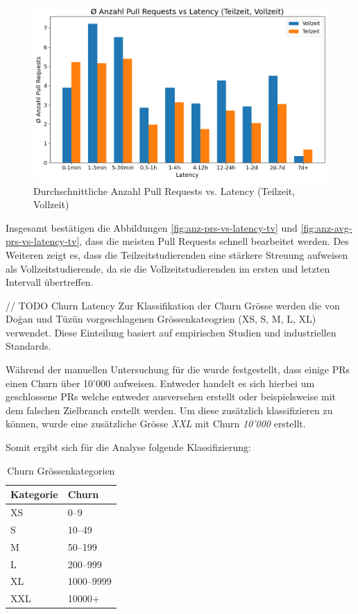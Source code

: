 \begin{figure}[htbp]
    \includegraphics[width=\textwidth]{Figures/anz-avg-prs-vs-latency-tv.png}
    \caption{Durchschnittliche Anzahl Pull Requests vs. Latency (Teilzeit, Vollzeit)}
    \label{fig:anz-avg-prs-vs-latency-tv}
\end{figure}
\newpage
Insgesamt bestätigen die Abbildungen \autoref{fig:anz-prs-vs-latency-tv} und \autoref{fig:anz-avg-prs-vs-latency-tv}, dass die meisten Pull Requests schnell bearbeitet werden. Des Weiteren zeigt es, dass die Teilzeitstudierenden eine stärkere Streuung aufweisen als Vollzeitstudierende, da sie die Vollzeitstudierenden im ersten und letzten Intervall übertreffen.

// TODO Churn Latency
\newpage
Zur Klassifikation der Churn Grösse werden die von Doğan und Tüzün vorgeschlagenen Grössenkateogrien (XS, S, M, L, XL) verwendet. Diese Einteilung basiert auf empirischen Studien und industriellen Standards. \parencite{dogan_towards_2022}

Während der manuellen Untersuchung für die  wurde festgestellt, dass einige PRs einen Churn über 10'000 aufweisen. Entweder handelt es sich hierbei um geschlossene PRs welche entweder ausversehen erstellt oder beispielsweise mit dem falschen Zielbranch erstellt werden. Um diese zusätzlich klassifizieren zu können, wurde eine zusätzliche Grösse \textit{XXL} mit Churn \textit{10'000} erstellt. 

Somit ergibt sich für die Analyse folgende Klassifizierung: 
\begin{table}[ht]
\caption{Churn Grössenkategorien}
\label{tab:churnkategorien}
\centering
\begin{tabular}{l l}
\toprule
\textbf{Kategorie} & \textbf{Churn} \\
\midrule
XS  & 0--9       \\
S        & 10--49     \\
M        & 50--199    \\
L         & 200--999   \\
XL   & 1000--9999 \\
XXL  & 10000+ \\
\bottomrule
\end{tabular}
\end{table}


